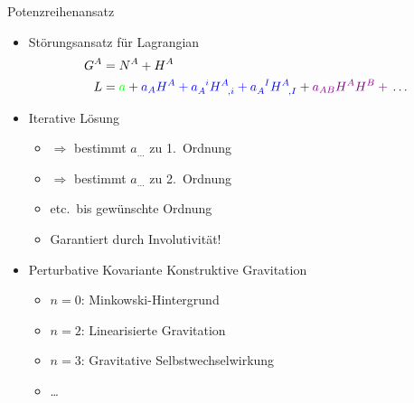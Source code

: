 \documentclass{beamer}
\begin{document}
    \begin{frame}{Potenzreihenansatz}
        \begin{itemize}
            \item Störungsansatz für Lagrangian
            \setlength{\belowdisplayskip}{-10pt}
            \begin{align*}
                G^A &= N^A + H^A \\
                L &= {\color{green}a} + {\color{blue}a_A H^A + a_A^{\hphantom Ai} H^A_{\hphantom{A},i} + a_A^{\hphantom AI} H^A_{\hphantom{A},I}} + {\color{violet}a_{AB} H^A H^B + {}} \ldots
            \end{align*}
            \item Iterative Lösung
            \begin{itemize}
                \item {} $\Rightarrow$ {\color{blue}bestimmt $a_{\dots}$ zu 1.\ Ordnung}
                \item {} $\Rightarrow$ {\color{violet}bestimmt $a_{\dots}$ zu 2.\ Ordnung}
                \item etc.\ bis gewünschte Ordnung
                \item Garantiert durch \alert{Involutivität}!
            \end{itemize}
            \item Perturbative Kovariante Konstruktive Gravitation
            \begin{itemize}
                \item $n=0$: Minkowski-Hintergrund
                \item $n=2$: Linearisierte Gravitation
                \item $n=3$: Gravitative Selbstwechselwirkung
                \item \ldots
            \end{itemize}
        \end{itemize}
    \end{frame}
\end{document}
